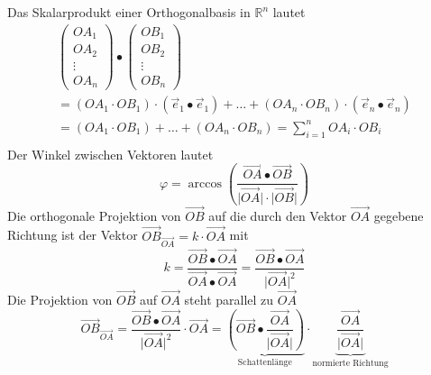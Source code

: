 Das Skalarprodukt einer Orthogonalbasis in $\mathbb{R}^n$ lautet
\begin{equation}
\boxed{\begin{array}{l}
\begin{pmatrix}OA_1\\OA_2\\\vdots\\OA_n\end{pmatrix}\bullet \begin{pmatrix}OB_1\\OB_2\\\vdots\\OB_n\end{pmatrix}\\
=\left(OA_1\cdot OB_1\right)\cdot\left(\overrightarrow{e}_1\bullet \overrightarrow{e}_1\right)+\dotso+\left(OA_n\cdot OB_n\right)\cdot\left(\overrightarrow{e}_n\bullet \overrightarrow{e}_n\right)\\
=\left(OA_1\cdot OB_1\right)+\dotso+\left(OA_n\cdot OB_n\right)=\displaystyle \sum_{i=1}^nOA_i\cdot OB_i\\
\end{array}}
\end{equation}
Der Winkel zwischen Vektoren lautet
\begin{equation}
\boxed{\varphi=\arccos\left(\dfrac{\overrightarrow{OA}\bullet \overrightarrow{OB}}{\Big\vert\overrightarrow{OA}\Big\vert\cdot \Big\vert\overrightarrow{OB}\Big\vert}\right)}
\end{equation}
Die orthogonale Projektion von $\overrightarrow{OB}$ auf die durch den Vektor $\overrightarrow{OA}$ gegebene Richtung ist der Vektor $\overrightarrow{OB}_{\overrightarrow{OA}}=k\cdot \overrightarrow{OA}$ mit
\begin{equation} 
\boxed{k=\dfrac{\overrightarrow{OB}\bullet \overrightarrow{OA}}{\overrightarrow{OA}\bullet \overrightarrow{OA}}=\dfrac{\overrightarrow{OB}\bullet \overrightarrow{OA}}{\Big\vert\overrightarrow{OA}\Big\vert^2}}
\end{equation} 
Die Projektion von $\overrightarrow{OB}$ auf $\overrightarrow{OA}$ steht parallel zu $\overrightarrow{OA}$
\begin{equation}
\boxed{\overrightarrow{OB}_{\overrightarrow{OA}}=\dfrac{\overrightarrow{OB}\bullet \overrightarrow{OA}}{\Big\vert\overrightarrow{OA}\Big\vert^2}\cdot \overrightarrow{OA}=\underbrace{\left(\overrightarrow{OB}\bullet \dfrac{\overrightarrow{OA}}{\Big\vert\overrightarrow{OA}\Big\vert}\right)}_{\text{Schattenlänge}}\cdot \underbrace{\dfrac{\overrightarrow{OA}}{\Big\vert\overrightarrow{OA}\Big\vert}}_{\text{normierte Richtung}}}
\end{equation}
